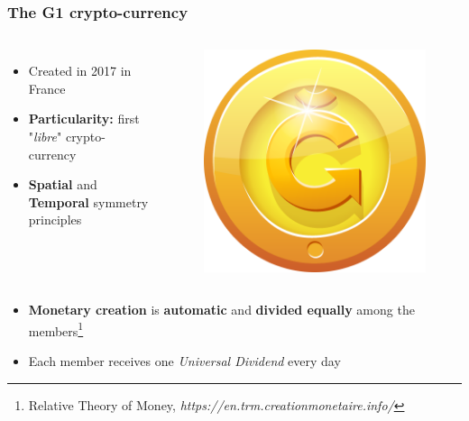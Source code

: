 \documentclass{beamer}
\begin{document}
\begin{frame}
	\frametitle{The G1 crypto-currency}
	\begin{columns}[c]
		\begin{itemize}
			\item Created in 2017 in France
			\item \textbf{Particularity:} first "\textit{libre}" crypto-currency
			\item \textbf{Spatial} and \textbf{Temporal} symmetry principles
		\end{itemize}
		\begin{figure}
			\includegraphics[width=.5\linewidth]{./figures/g1_logo}
		\end{figure}
	\end{columns}
	\bigskip
	\begin{itemize}
		\item \textbf{Monetary creation} is \textbf{automatic} and \textbf{divided equally} among the members\footnote{Relative Theory of Money, \textit{https://en.trm.creationmonetaire.info/}}
		\item Each member receives one \textit{Universal Dividend} every day
	\end{itemize}
\end{frame}

\end{document}
